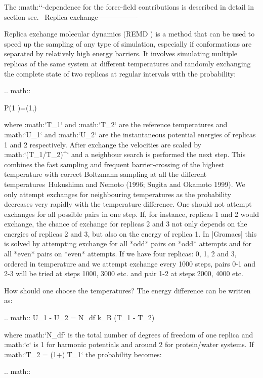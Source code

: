 The :math:`\lambda`-dependence for the force-field contributions is
described in detail in section sec. 
Replica exchange
----------------

Replica exchange molecular dynamics (REMD
) is a
method that can be used to speed up the sampling of any type of
simulation, especially if conformations are separated by relatively high
energy barriers. It involves simulating multiple replicas of the same
system at different temperatures and randomly exchanging the complete
state of two replicas at regular intervals with the probability:

.. math::

   P(1 )=\min\left(1,\exp{} \right)

where :math:`T_1` and :math:`T_2` are the reference temperatures and
:math:`U_1` and :math:`U_2` are the instantaneous potential energies of
replicas 1 and 2 respectively. After exchange the velocities are scaled
by :math:`(T_1/T_2)^{}` and a neighbour search is performed the
next step. This combines the fast sampling and frequent barrier-crossing
of the highest temperature with correct Boltzmann sampling at all the
different temperatures Hukushima and Nemoto (1996; Sugita and Okamoto
1999). We only attempt exchanges for neighbouring temperatures as the
probability decreases very rapidly with the temperature difference. One
should not attempt exchanges for all possible pairs in one step. If, for
instance, replicas 1 and 2 would exchange, the chance of exchange for
replicas 2 and 3 not only depends on the energies of replicas 2 and 3,
but also on the energy of replica 1. In |Gromacs| this is solved by
attempting exchange for all *odd* pairs on *odd* attempts and for all
*even* pairs on *even* attempts. If we have four replicas: 0, 1, 2 and
3, ordered in temperature and we attempt exchange every 1000 steps,
pairs 0-1 and 2-3 will be tried at steps 1000, 3000 etc. and pair 1-2 at
steps 2000, 4000 etc.

How should one choose the temperatures? The energy difference can be
written as:

.. math:: U_1 - U_2 =  N_{df}  k_B (T_1 - T_2)

where :math:`N_{df}` is the total number of degrees of freedom of one
replica and :math:`c` is 1 for harmonic potentials and around 2 for
protein/water systems. If :math:`T_2 = (1+\epsilon) T_1` the probability
becomes:

.. math::

